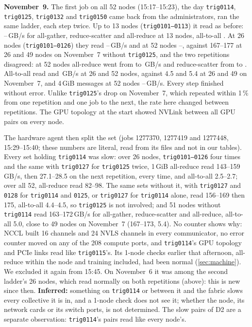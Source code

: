 \textbf{November~9.} The first job on all 52 nodes (15:17--15:23), the day \texttt{trig0114}, \texttt{trig0125}, \texttt{trig0132} and \texttt{trig0150} came back from the administrators, ran the same ladder, each step twice. Up to 13 nodes (\texttt{trig0101--0113}) it read as before: \TriNineThirteenLo--\TriNineThirteenHi\,GB/s for all-gather, reduce-scatter and all-reduce at 13 nodes, all-to-all \TriNineAlltoallThirteen. At 26 nodes (\texttt{trig0101--0126}) they read \TriNineTwoSixLo--\TriNineTwoSixHi\,GB/s and at 52 nodes \TriNineFiftyTwoLo--\TriNineFiftyTwoHi, against 167--177 at 26 and 49 nodes on November~7 without \texttt{trig0125}, and the two repetitions disagreed: at 52 nodes all-reduce went from \TriNineReduceOne{} to \TriNineReduceTwo\,GB/s and reduce-scatter from \TriNineScatterOne{} to \TriNineScatterTwo. All-to-all read \TriNineAlltoallTwoSix{} and \TriNineAlltoallFiftyTwo\,GB/s at 26 and 52 nodes, against 4.5 and 5.4 at 26 and 49 on November~7, and 4\,GiB messages at 52 nodes \TriNineBigLo--\TriNineBigHi\,GB/s. Every step finished without error. Unlike \texttt{trig0125}'s drop on November~7, which repeated within 1\,\% from one repetition and one job to the next, the rate here changed between repetitions. The GPU topology at the start showed NVLink between all GPU pairs on every node.

The hardware agent then split the set (jobs 1277370, 1277419 and 1277448, 15:29--15:40; these numbers are literal, read from its files and not in our tables). Every set holding \texttt{trig0114} was slow: over 26 nodes, \texttt{trig0101--0126} four times and the same with \texttt{trig0127} for \texttt{trig0125} twice, 1\,GiB all-reduce read 143--159\,GB/s, then 27.1--28.5 on the next repetition, every time, and all-to-all 2.5--2.7; over all 52, all-reduce read 82--98. The same sets without it, with \texttt{trig0127} and \texttt{0128} for \texttt{trig0114} and \texttt{0125}, or \texttt{trig0127} for \texttt{trig0114} alone, read 156--169 then 175, all-to-all 4.4--4.5, so \texttt{trig0125} is not involved; and 51 nodes without \texttt{trig0114} read 163--172\,GB/s for all-gather, reduce-scatter and all-reduce, all-to-all 5.0, close to 49 nodes on November~7 (167--173, 5.4). No counter shows why: NCCL built 16 channels and 24 NVLS channels in every communicator, no error counter moved on any of the 208 compute ports, and \texttt{trig0114}'s GPU topology and PCIe links read like \texttt{trig0115}'s. Its 1-node checks earlier that afternoon, all-reduce within the node and training included, had been normal (\cref{sec:machine}). We excluded it again from 15:45. On November~6 it was among the second ladder's 26 nodes, which read normally on both repetitions (above): this is new since then. \textbf{Inferred:} something on \texttt{trig0114} or between it and the fabric slows every collective it is in, and a 1-node check does not see it; whether the node, its network cards or its switch ports, is not determined. The slow pairs of D2 are a separate observation: \texttt{trig0114}'s pairs read like every node's.

